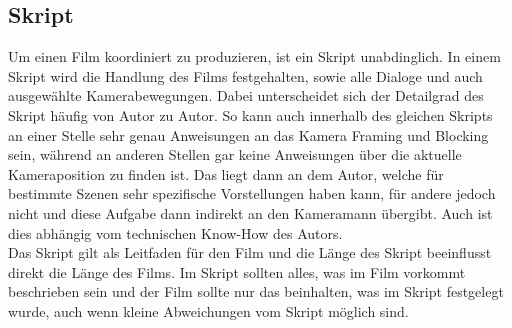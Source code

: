 \subsection{Skript}
Um einen Film koordiniert zu produzieren, ist ein Skript unabdinglich. In einem Skript wird die Handlung des Films festgehalten, sowie alle Dialoge und auch ausgewählte Kamerabewegungen. Dabei unterscheidet sich der Detailgrad des Skript häufig von Autor zu Autor. So kann auch innerhalb des gleichen Skripts an einer Stelle sehr genau Anweisungen an das Kamera Framing und Blocking sein, während an anderen Stellen gar keine Anweisungen über die aktuelle Kameraposition zu finden ist. Das liegt dann an dem Autor, welche für bestimmte Szenen sehr spezifische Vorstellungen haben kann, für andere jedoch nicht und diese Aufgabe dann indirekt an den Kameramann übergibt. Auch ist dies abhängig vom technischen Know-How des Autors.\\
Das Skript gilt als Leitfaden für den Film und die Länge des Skript beeinflusst direkt die Länge des Films. Im Skript sollten alles, was im Film vorkommt beschrieben sein und der Film sollte nur das beinhalten, was im Skript festgelegt wurde, auch wenn kleine Abweichungen vom Skript möglich sind. 
